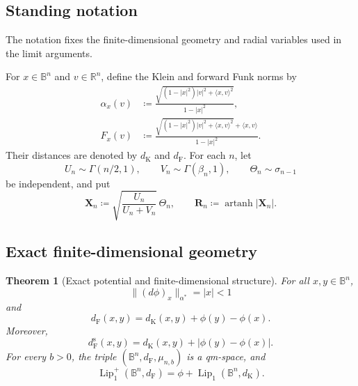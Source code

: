\documentclass[10pt,a4paper]{amsart}
\numberwithin{equation}{section}
\newtheorem{theorem}{Theorem}[section]
\newcommand{\R}{\mathbb R}
\newcommand{\B}{\mathbb B}
\newcommand{\Lipplus}{\operatorname{Lip}^{+}_{1}}
\DeclareMathOperator{\artanh}{artanh}
\newcommand{\dF}{d_{\mathrm F}}
\newcommand{\dK}{d_{\mathrm K}}
\begin{document}
\subsection{Standing notation}

The notation fixes the finite-dimensional geometry and radial variables used in the limit arguments.

For $x\in\B^n$ and $v\in\R^n$, define the Klein and forward Funk norms by
\begin{align}
 \alpha_x(v)
 &\coloneqq\frac{\sqrt{(1-|x|^2)|v|^2+\langle x,v\rangle^2}}{1-|x|^2},
 \label{eq:klein-norm}\\
 F_x(v)
 &\coloneqq\frac{\sqrt{(1-|x|^2)|v|^2+\langle x,v\rangle^2}+\langle x,v\rangle}{1-|x|^2}.
 \label{eq:funk-norm}
\end{align}
Their distances are denoted by $\dK$ and $\dF$.
For each $n$, let
\[ U_n\sim\Gamma(n/2,1), \qquad V_n\sim\Gamma(\beta_n,1), \qquad \Theta_n\sim\sigma_{n-1} \]
be independent, and put
\[ \mathbf X_n\coloneqq\sqrt{\frac{U_n}{U_n+V_n}}\,\Theta_n, \qquad \mathbf R_n\coloneqq\artanh|\mathbf X_n|. \]

\subsection{Exact finite-dimensional geometry}

\begin{theorem}[Exact potential and finite-dimensional structure]\label{thm:exact-finite-geometry}
For all $x,y\in\B^n$,
\begin{equation}\label{eq:dual-norm} \lVert(d\phi)_x\rVert_{\alpha^*}=|x|<1 \end{equation}
and
\begin{equation}\label{eq:distance-exact} \dF(x,y)=\dK(x,y)+\phi(y)-\phi(x). \end{equation}
Moreover,
\begin{equation}\label{eq:symmetrization} \dF^{\mathrm s}(x,y)=\dK(x,y)+|\phi(y)-\phi(x)|. \end{equation}
For every $b>0$, the triple $(\B^n,\dF,\mu_{n,b})$ is a qm-space, and
\begin{equation}\label{eq:affine-lip} \Lipplus(\B^n,\dF) =\phi+\operatorname{Lip}_1(\B^n,\dK). \end{equation}
\end{theorem}
\end{document}
